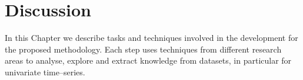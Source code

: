 \section{Discussion}
\label{Sec:MethodologyDiscussion}
In this Chapter we describe tasks and techniques involved in the development for the proposed methodology. Each step uses techniques from different research areas to analyse, explore and extract knowledge from datasets, in particular for univariate time--series.


